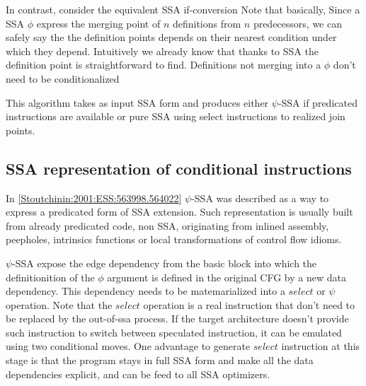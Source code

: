 In contrast, consider the equivalent SSA if-conversion 
Note that basically, Since a SSA $\phi$ express the merging point of $n$ definitions from $n$ predecessors, we can safely say the the definition points depends on their nearest condition under which they depend. Intuitively we already know that thanks to SSA the definition point is straightforward to find. Definitions not merging into a $\phi$ don't need to be conditionalized

This algorithm takes as input SSA form and produces either $\psi$-SSA if predicated instructions are available or pure SSA using select instructions to realized join points.

\subsection{SSA representation of conditional instructions}

In \ref{Stoutchinin:2001:ESS:563998.564022} $\psi$-SSA was described as a way to express a predicated form of SSA extension. Such representation is usually built from already predicated code, non SSA, originating from inlined assembly, peepholes, intrinsics functions or local transformations of control flow idioms. 

$\psi$-SSA expose the edge dependency from the basic block into which the definitionition of the $\phi$ argument is defined in the original CFG by a new data dependency. This dependency needs to be matemarialized into a $select$ or $\psi$ operation. Note that the $select$ operation is a real instruction that don't need to be replaced by the out-of-ssa process. If the target architecture doesn't provide such instruction to switch between speculated instruction, it can be emulated using two conditional moves. One advantage to generate $select$ instruction at this stage is that the program stays in full SSA form and make all the data dependencies explicit, and can be feed to all SSA optimizers. 

